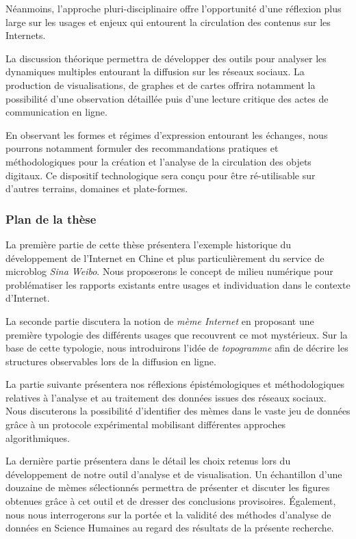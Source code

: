 Néanmoins, l'approche pluri-disciplinaire offre l'opportunité d'une réflexion plus large sur les usages et enjeux qui entourent la circulation des contenus sur les Internets. 

La discussion théorique permettra de développer des outils pour analyser les dynamiques multiples entourant la diffusion sur les réseaux sociaux. La production de visualisations, de graphes et de cartes offrira notamment la possibilité d'une observation détaillée puis d'une lecture critique des actes de communication en ligne.

En observant les formes et régimes d'expression entourant les échanges, nous pourrons notamment formuler des recommandations pratiques et méthodologiques pour la création et l'analyse de la circulation des objets digitaux. Ce dispositif technologique sera conçu pour être ré-utilisable sur d'autres terrains, domaines et plate-formes.

\subsubsection{Plan de la thèse}


La première partie de cette thèse présentera l'exemple historique du développement de l'Internet en Chine et plus particulièrement du service de microblog \textit{Sina Weibo}. Nous proposerons le concept de {milieu numérique} pour problématiser les rapports existants entre usages et individuation dans le contexte d'Internet.

La seconde partie discutera la notion de \textit{mème Internet} en proposant une première typologie des différents usages que recouvrent ce mot mystérieux. Sur la base de cette typologie, nous introduirons l'idée de \textit{topogramme} afin de décrire les structures observables lors de la diffusion en ligne.

La partie suivante présentera nos réflexions épistémologiques et méthodologiques relatives à l'analyse et au traitement des données issues des réseaux sociaux. Nous discuterons la possibilité d'identifier des mèmes dans le vaste jeu de données grâce à un protocole expérimental mobilisant différentes approches algorithmiques.

La dernière partie présentera dans le détail les choix retenus lors du développement de notre outil d'analyse et de visualisation. Un échantillon d'une douzaine de mèmes sélectionnés permettra de présenter et discuter les figures obtenues grâce à cet outil et de dresser des conclusions provisoires. \'Egalement, nous nous interrogerons sur la portée et la validité des méthodes d'analyse de données en Science Humaines au regard des résultats de la présente recherche.

